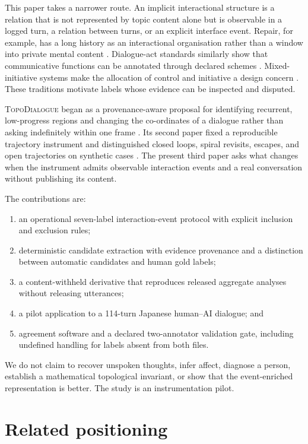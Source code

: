 \documentclass[11pt]{article}
\newcommand{\system}{\textsc{TopoDialogue}}
\begin{document}
This paper takes a narrower route. An implicit interactional structure is a
relation that is not represented by topic content alone but is observable in a
logged turn, a relation between turns, or an explicit interface event. Repair,
for example, has a long history as an interactional organisation rather than a
window into private mental content \citep{schegloff1977repair}. Dialogue-act
standards similarly show that communicative functions can be annotated through
declared schemes \citep{iso2020dialogue}. Mixed-initiative systems make the
allocation of control and initiative a design concern \citep{horvitz1999mixed}.
These traditions motivate labels whose evidence can be inspected and disputed.

\system{} began as a provenance-aware proposal for identifying recurrent,
low-progress regions and changing the co-ordinates of a dialogue rather than
asking indefinitely within one frame \citep{sakakibara2026concept}. Its second
paper fixed a reproducible trajectory instrument and distinguished closed
loops, spiral revisits, escapes, and open trajectories on synthetic cases
\citep{sakakibara2026instrument}. The present third paper asks what changes when
the instrument admits observable interaction events and a real conversation
without publishing its content.

The contributions are:
\begin{enumerate}
  \item an operational seven-label interaction-event protocol with explicit
        inclusion and exclusion rules;
  \item deterministic candidate extraction with evidence provenance and a
        distinction between automatic candidates and human gold labels;
  \item a content-withheld derivative that reproduces released aggregate
        analyses without releasing utterances;
  \item a pilot application to a 114-turn Japanese human--AI dialogue; and
  \item agreement software and a declared two-annotator validation gate,
        including undefined handling for labels absent from both files.
\end{enumerate}

We do not claim to recover unspoken thoughts, infer affect, diagnose a person,
establish a mathematical topological invariant, or show that the event-enriched
representation is better. The study is an instrumentation pilot.

\section{Related positioning}
\end{document}
